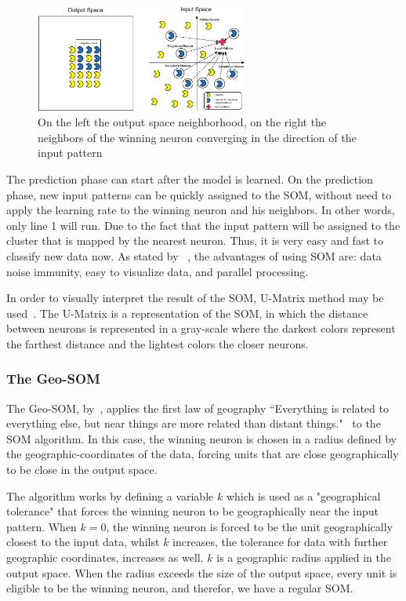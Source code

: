 \documentclass[journal]{IEEEtran}
\begin{document}
\begin{figure}
  \begin{center}
    \includegraphics[width=7cm]{images/5_neighbours_converge.eps}
  \end{center}
  \caption{ On the left the output space neighborhood, on the right the neighbors of the winning neuron converging in the direction of the input pattern }
  \label{fig:5_neighbours_converge}
\end{figure}

The prediction phase can start after the model is learned. On the prediction phase, new input patterns can be quickly assigned to the \ac{SOM}, without need to apply the learning rate to the winning neuron and his neighbors. In other words, only line 1 will run. Due to the fact that the input pattern will be assigned to the cluster that is mapped by the nearest neuron. Thus, it is very easy and fast to classify new data now. As stated by ~\citet{Liu2012b}, the advantages of using \ac{SOM} are: data noise immunity, easy to visualize data, and parallel processing.

In order to visually interpret the result of the \ac{SOM}, \ac{U-Matrix} method may be used~\citep{Bacao2005}. The \ac{U-Matrix} is a representation of the \ac{SOM}, in which the distance between neurons is represented in a gray-scale where the darkest colors represent the farthest distance and the lightest colors the closer neurons.

\subsubsection{The Geo-SOM} 
\label{sub:types_of_soms}
The Geo-SOM, by~\citet{Bacao2005}, applies the first law of geography “Everything is related to everything else, but near things are more related than distant things."~\cite{citeulike:612692} to the \ac{SOM} algorithm. In this case, the winning neuron is chosen in a radius defined by the geographic-coordinates of the data, forcing units that are close geographically to be close in the output space.

The algorithm works by defining a variable $k$ which is used as a "geographical tolerance" that forces the winning neuron to be geographically near the input pattern. When $k=0$, the winning neuron is forced to be the unit geographically closest to the input data, whilst $k$ increases, the tolerance for data with further geographic coordinates, increases as well. $k$ is a geographic radius applied in the output space. When the radius exceeds the size of the output space, every unit is eligible to be the winning neuron, and therefor, we have a regular \ac{SOM}.
\end{document}
